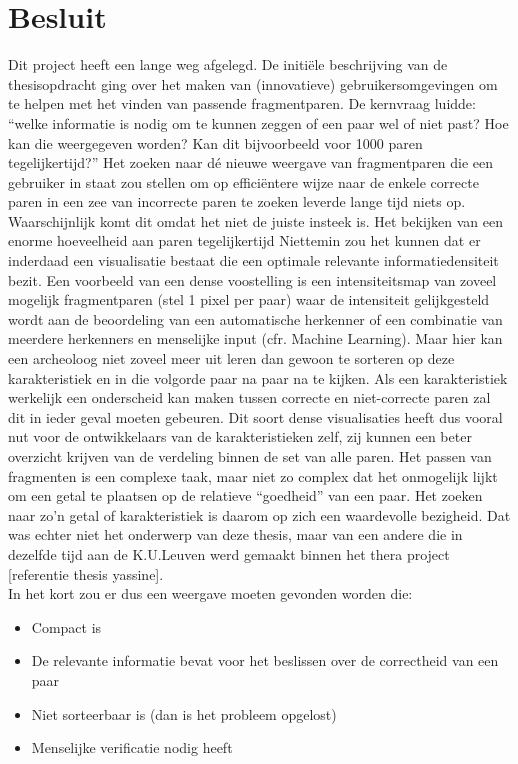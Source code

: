 \chapter{Besluit}
\label{besluit}

Dit project heeft een lange weg afgelegd. De initi\"ele beschrijving van de thesisopdracht ging over het maken van (innovatieve) gebruikersomgevingen om te helpen met het vinden van passende fragmentparen. De kernvraag luidde: ``welke informatie is nodig om te kunnen zeggen of een paar wel of niet past? Hoe kan die weergegeven worden? Kan dit bijvoorbeeld voor 1000 paren tegelijkertijd?'' Het zoeken naar d\'e nieuwe weergave van fragmentparen die een gebruiker in staat zou stellen om op effici\"entere wijze naar de enkele correcte paren in een zee van incorrecte paren te zoeken leverde lange tijd niets op. Waarschijnlijk komt dit omdat het niet de juiste insteek is. Het bekijken van een enorme hoeveelheid aan paren tegelijkertijd Niettemin zou het kunnen dat er inderdaad een visualisatie bestaat die een optimale relevante informatiedensiteit bezit. Een voorbeeld van een dense voostelling is een intensiteitsmap van zoveel mogelijk fragmentparen (stel 1 pixel per paar) waar de intensiteit gelijkgesteld wordt aan de beoordeling van een automatische herkenner of een combinatie van meerdere herkenners en menselijke input (cfr. Machine Learning). Maar hier kan een archeoloog niet zoveel meer uit leren dan gewoon te sorteren op deze karakteristiek en in die volgorde paar na paar na te kijken. Als een karakteristiek werkelijk een onderscheid kan maken tussen correcte en niet-correcte paren zal dit in ieder geval moeten gebeuren. Dit soort dense visualisaties heeft dus vooral nut voor de ontwikkelaars van de karakteristieken zelf, zij kunnen een beter overzicht krijven van de verdeling binnen de set van alle paren. Het passen van fragmenten is een complexe taak, maar niet zo complex dat het onmogelijk lijkt om een getal te plaatsen op de relatieve ``goedheid'' van een paar. Het zoeken naar zo'n getal of karakteristiek is daarom op zich een waardevolle bezigheid. Dat was echter niet het onderwerp van deze thesis, maar van een andere die in dezelfde tijd aan de K.U.Leuven werd gemaakt binnen het thera project [referentie thesis yassine].\\

In het kort zou er dus een weergave moeten gevonden worden die:

\begin{itemize}
	\item Compact is
	\item De relevante informatie bevat voor het beslissen over de correctheid van een paar
	\item Niet sorteerbaar is (dan is het probleem opgelost)
	\item Menselijke verificatie nodig heeft
\end{itemize}

